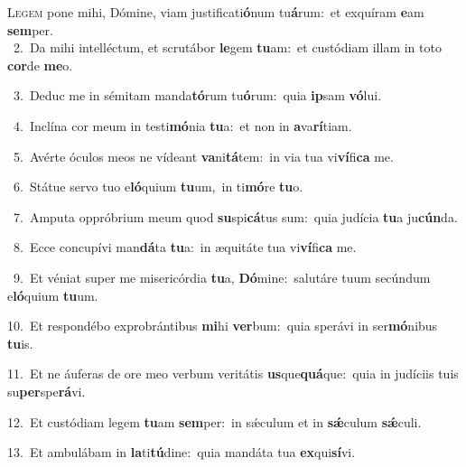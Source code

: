 \lettrine{\initial\textcolor{\initialcolor}{L}}{egem} pone mihi, Dómine, viam justificati\-\textbf{ó}\-num tu\-\textbf{á}\-rum:~\star et exquíram \textbf{e}\-am \textbf{sem}\-per.\\
{\numbfont\textcolor{\numbcolor}{~2.}}~Da mihi intelléctum, et scrutábor \textbf{le}\-gem \textbf{tu}\-am:~\star et custódiam illam in toto \textbf{cor}\-de \textbf{me}\-o.\par
{\numbfont\textcolor{\numbcolor}{~3.}}~Deduc me in sémitam manda\-\textbf{tó}\-rum tu\-\textbf{ó}\-rum:~\star quia \textbf{ip}\-sam \textbf{vó}\-lui.\par
{\numbfont\textcolor{\numbcolor}{~4.}}~Inclína cor meum in testi\-\textbf{mó}\-nia \textbf{tu}\-a:~\star et non in \textbf{a}\-va\-\textbf{rí}\-tiam.\par
{\numbfont\textcolor{\numbcolor}{~5.}}~Avérte óculos meos ne vídeant \textbf{va}\-ni\-\textbf{tá}\-tem:~\star in via tua vi\-\textbf{ví}\-fi\textbf{ca} me.\par
{\numbfont\textcolor{\numbcolor}{~6.}}~Státue servo tuo e\-\textbf{ló}\-quium \textbf{tu}\-um,~\star in ti\-\textbf{mó}\-re \textbf{tu}\-o.\par
{\numbfont\textcolor{\numbcolor}{~7.}}~Amputa oppróbrium meum quod \textbf{su}\-spi\-\textbf{cá}\-tus sum:~\star quia judícia \textbf{tu}\-a ju\-\textbf{cún}\-da.\par
{\numbfont\textcolor{\numbcolor}{~8.}}~Ecce concupívi man\-\textbf{dá}\-ta \textbf{tu}\-a:~\star in æquitáte tua vi\-\textbf{ví}\-fi\textbf{ca} me.\par
{\numbfont\textcolor{\numbcolor}{~9.}}~Et véniat super me misericórdia \textbf{tu}\-a, \textbf{Dó}\-mine:~\star salutáre tuum secúndum e\-\textbf{ló}\-quium \textbf{tu}\-um.\par
{\numbfont\textcolor{\numbcolor}{10.}}~Et respondébo exprobrántibus \textbf{mi}\-hi \textbf{ver}\-bum:~\star quia sperávi in ser\-\textbf{mó}\-nibus \textbf{tu}\-is.\par
{\numbfont\textcolor{\numbcolor}{11.}}~Et ne áuferas de ore meo verbum veritátis \textbf{us}\-que\-\textbf{quá}\-que:~\star quia in judíciis tuis su\-\textbf{per}\-spe\-\textbf{rá}\-vi.\par
{\numbfont\textcolor{\numbcolor}{12.}}~Et custódiam legem \textbf{tu}\-am \textbf{sem}\-per:~\star in sǽculum et in \textbf{sǽ}\-culum \textbf{sǽ}\-culi.\par
{\numbfont\textcolor{\numbcolor}{13.}}~Et ambulábam in \textbf{la}\-ti\-\textbf{tú}\-dine:~\star quia mandáta tua \textbf{ex}\-qui\-\textbf{sí}\-vi.\par
